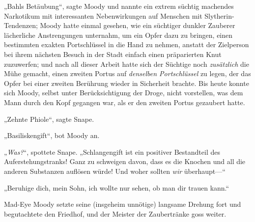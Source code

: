 „Bahls Betäubung“, sagte Moody und nannte ein extrem süchtig machendes Narkotikum mit interessanten Nebenwirkungen auf Menschen mit Slytherin-Tendenzen; Moody hatte einmal gesehen, wie ein süchtiger dunkler Zauberer lächerliche Anstrengungen unternahm, um ein Opfer dazu zu bringen, einen bestimmten exakten Portschlüssel in die Hand zu nehmen, anstatt der Zielperson bei ihrem nächsten Besuch in der Stadt einfach einen präparierten Knut zuzuwerfen; und nach all dieser Arbeit hatte sich der Süchtige noch \emph{zusätzlich} die Mühe gemacht, einen zweiten Portus auf \emph{denselben Portschlüssel} zu legen, der das Opfer bei einer zweiten Berührung wieder in Sicherheit brachte. Bis heute konnte sich Moody, selbst unter Berücksichtigung der Droge, nicht vorstellen, was dem Mann durch den Kopf gegangen war, als er den zweiten Portus gezaubert hatte.

„Zehnte Phiole“, sagte Snape.

„Basiliskengift“, bot Moody an.

„\emph{Was?}“, spottete Snape. „Schlangengift ist ein positiver Bestandteil des Auferstehungstranks! Ganz zu schweigen davon, dass es die Knochen und all die anderen Substanzen auflösen würde! Und woher sollten \emph{wir} überhaupt—“

„Beruhige dich, mein Sohn, ich wollte nur sehen, ob man dir trauen kann.“

Mad-Eye Moody setzte seine (insgeheim unnötige) langsame Drehung fort und begutachtete den Friedhof, und der Meister der Zaubertränke goss weiter.

